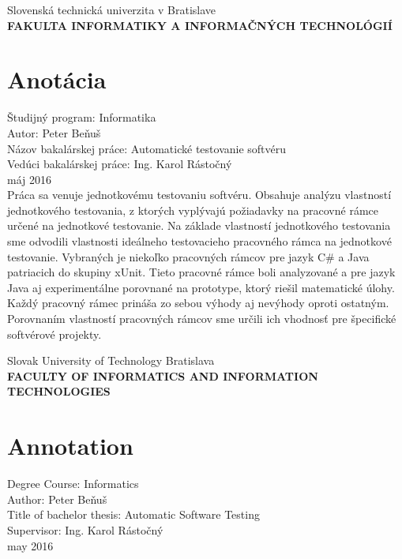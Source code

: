 \documentclass[11pt,twoside,slovak,a4paper]{article}
\begin{document}
	
	\begin{titlepage}
		\begin{center}
			\large 		Slovenská technická univerzita v Bratislave\\
			\textbf{\MakeUppercase{Fakulta informatiky a informačných technológií}}\\
			\hrulefill
		\end{center}
			\section*{Anotácia}
		Študijný program: Informatika\\
		Autor: Peter Beňuš\\
		Názov bakalárskej práce: Automatické testovanie softvéru \\
		Vedúci bakalárskej práce: Ing. Karol Rástočný\\
		máj 2016\\
		Práca sa venuje jednotkovému testovaniu softvéru. Obsahuje analýzu vlastností jednotkového testovania, z ktorých vyplývajú požiadavky na pracovné rámce určené na jednotkové testovanie. Na základe vlastností jednotkového testovania sme odvodili vlastnosti ideálneho testovacieho pracovného rámca na jednotkové testovanie. Vybraných je niekoľko pracovných rámcov pre jazyk C\# a Java patriacich do skupiny xUnit. Tieto pracovné rámce boli analyzované a pre jazyk Java aj experimentálne porovnané na prototype, ktorý riešil matematické úlohy. Každý pracovný rámec prináša zo sebou výhody aj nevýhody oproti ostatným. Porovnaním vlastností pracovných rámcov sme určili ich vhodnosť pre špecifické softvérové projekty.
	\end{titlepage}
	
	\begin{titlepage}
		\begin{center}
			\large 		Slovak University of Technology Bratislava\\
			\textbf{\MakeUppercase{Faculty of Informatics and Information Technologies}}\\
			\hrulefill
		\end{center}
		\section*{Annotation}
		Degree Course: Informatics\\
		Author: Peter Beňuš \\
		Title of bachelor thesis: Automatic Software Testing\\
		Supervisor: Ing. Karol Rástočný \\
		may 2016 \\
		
		
		
	\end{titlepage}
	
\end{document}
